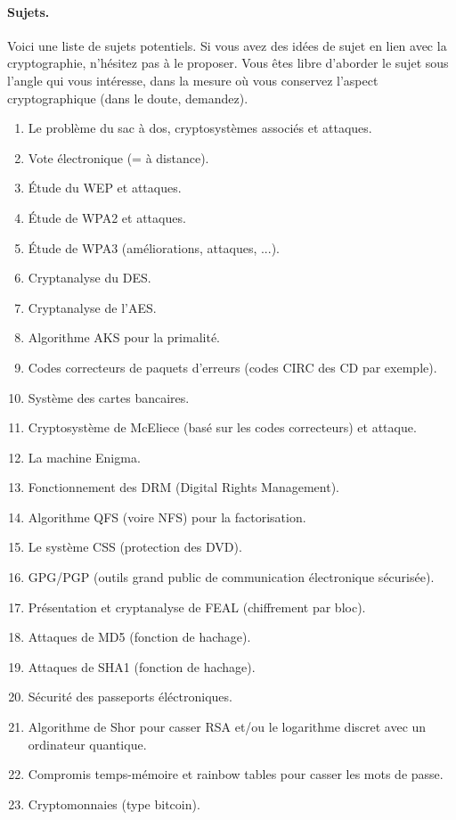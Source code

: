 \documentclass[french,a4paper,11pt]{exam}
\begin{document}
\paragraph{Sujets. } Voici une liste de sujets potentiels. Si vous avez des idées de sujet en lien avec la cryptographie, n'hésitez pas à le proposer. Vous êtes libre
d'aborder le sujet sous l'angle qui vous intéresse, dans la mesure où vous
conservez l'aspect cryptographique (dans le doute, demandez).
\begin{enumerate}
\item Le problème du sac à dos, cryptosystèmes associés et attaques.
\item Vote électronique (= à distance).
\item Étude du WEP et attaques.
\item Étude de WPA2 et attaques.
\item Étude de WPA3 (améliorations, attaques, ...).
\item Cryptanalyse du DES.
\item Cryptanalyse de l'AES.
\item Algorithme AKS pour la primalité.
\item Codes correcteurs de paquets d’erreurs (codes CIRC des CD par exemple).
\item Système des cartes bancaires.
\item Cryptosystème de McEliece (basé sur les codes correcteurs) et attaque.
\item La machine Enigma.
\item Fonctionnement des DRM (Digital Rights Management).
\item Algorithme QFS (voire NFS) pour la factorisation.
\item Le système CSS (protection des DVD).
\item GPG/PGP (outils grand public de communication électronique sécurisée).
\item Présentation et cryptanalyse de FEAL (chiffrement par bloc).
\item Attaques de MD5 (fonction de hachage).
\item Attaques de SHA1 (fonction de hachage).
\item Sécurité des passeports éléctroniques.
\item Algorithme de Shor pour casser RSA et/ou le logarithme discret avec un ordinateur quantique.
\item Compromis temps-mémoire et rainbow tables pour casser les mots de passe.
\item Cryptomonnaies (type bitcoin).

\end{enumerate}
\end{document}
